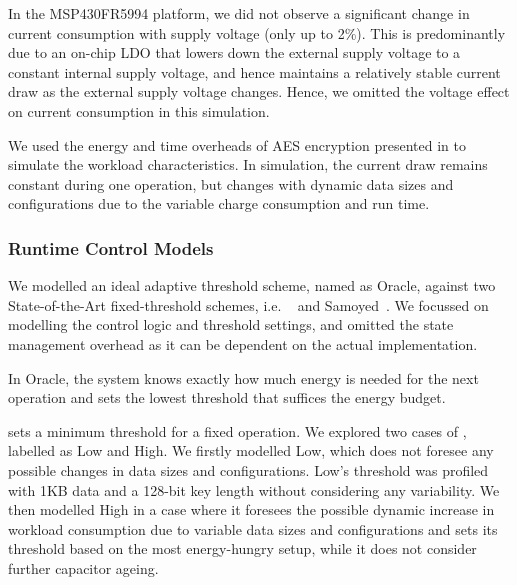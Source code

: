 

In the MSP430FR5994 platform, we did not observe a significant change in current consumption with supply voltage (only up to 2\%). 
This is predominantly due to an on-chip LDO that lowers down the external supply voltage to a constant internal supply voltage, and hence maintains a relatively stable current draw as the external supply voltage changes. 
Hence, we omitted the voltage effect on current consumption in this simulation. 

We used the energy and time overheads of AES encryption presented in  to simulate the workload characteristics. 
In simulation, the current draw remains constant during one operation, but changes with dynamic data sizes and configurations due to the variable charge consumption and run time.

\subsubsection{Runtime Control Models}

We modelled an ideal adaptive threshold scheme, named as \nn{} Oracle, against two State-of-the-Art fixed-threshold schemes, i.e. \debs{}~\cite{gomez2016dynamic} and Samoyed~\cite{maeng2019supporting}.
We focussed on modelling the control logic and threshold settings, and omitted the state management overhead as it can be dependent on the actual implementation. 

In \nn{} Oracle, the system knows exactly how much energy is needed for the next operation and sets the lowest threshold that suffices the energy budget. 

\debs{} sets a minimum threshold for a fixed operation. 
We explored two cases of \debs{}, labelled as \debs{} Low and \debs{} High.
We firstly modelled \debs{} Low, which does not foresee any possible changes in data sizes and configurations. 
\debs{} Low's threshold was profiled with 1KB data and a 128-bit key length without considering any variability. 
We then modelled \debs{} High in a case where it foresees the possible dynamic increase in workload consumption due to variable data sizes and configurations and sets its threshold based on the most energy-hungry setup, while it does not consider further capacitor ageing.

